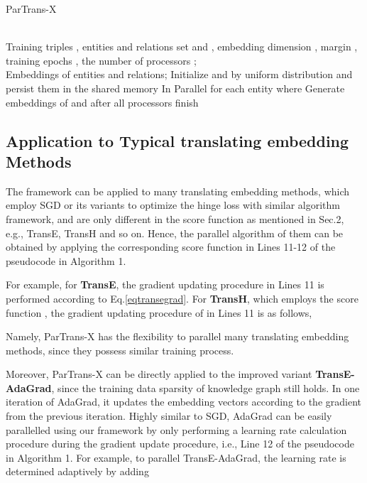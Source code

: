 \documentclass[sigconf]{acmart}
\begin{document}
\begin{algorithm}[htbp]
  \caption{ParTrans-X}
  \label{ParTrans-X}
  \begin{algorithmic}[1]
  \REQUIRE ~~\\
    Training triples , entities and relations set  and , embedding dimension , margin , training epochs , the number of processors ;
  \ENSURE ~~ \\
     Embeddings of entities and relations;
  \STATE Initialize  and  by uniform distribution and persist them in the shared memory
\FOR { \TO }   \STATE   \quad  \quad  \quad  \quad  \quad  \quad  \quad  \quad  \quad  \quad  \quad   \quad  \quad  \quad   In Parallel
\STATE  
  \FOR { \TO }
\LOOP
    \STATE  for each entity 
\STATE \STATE  \STATE 
\STATE  where   \quad \STATE  \quad \ENDLOOP
  \ENDFOR
   \ENDFOR
    \STATE Generate embeddings of  and  after all processors finish
  \end{algorithmic}
\end{algorithm}


\subsection{Application to Typical translating embedding Methods}
The framework can be applied to many translating embedding methods,  which employ SGD or its variants to optimize the hinge loss with similar algorithm framework, and are only different in the score function  as mentioned in Sec.2, e.g., TransE, TransH and so on. Hence, the parallel algorithm of them can be obtained by applying the corresponding score function in Lines 11-12 of the pseudocode in Algorithm 1. 

For example, for \textbf{TransE}, the gradient updating procedure in Lines 11 is performed according to Eq.\eqref{eqtransegrad}. 
For \textbf{TransH}, which employs the score function , the gradient updating procedure of  in  Lines 11  is as follows,

Namely,  ParTrans-X  has the flexibility to parallel many translating embedding methods, since they possess similar training process.


Moreover, ParTrans-X can be directly applied to the improved variant \textbf{TransE-AdaGrad}, since the training data sparsity of knowledge graph still holds. 
In one iteration of AdaGrad, it updates the embedding vectors according to the gradient from the previous iteration. Highly similar to SGD, AdaGrad can be easily parallelled using our framework by only performing a learning rate calculation procedure during the gradient update procedure, i.e., Line 12 of the pseudocode in Algorithm 1. For example, to parallel TransE-AdaGrad, the learning rate is determined adaptively by adding 
 
\end{document}
